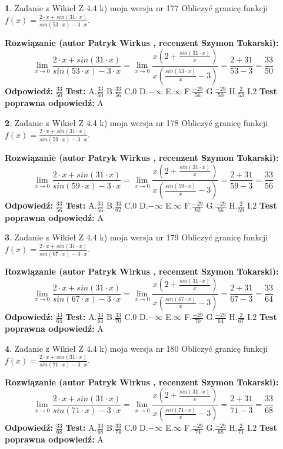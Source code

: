 \documentclass[12pt, a4paper]{article}
\theoremstyle{definition} %
\newtheorem{zad}{}
\newcommand{\zadStart}[1]{\begin{zad}#1\newline}
\newcommand{\zadStop}{\end{zad}}
\newcommand{\rozwStart}[2]{\noindent \textbf{Rozwiązanie (autor #1 , recenzent #2): }\newline}
\newcommand{\rozwStop}{\newline}
\newcommand{\odpStart}{\noindent \textbf{Odpowiedź:}\newline}
\newcommand{\odpStop}{\newline}
\newcommand{\testStart}{\noindent \textbf{Test:}\newline}
\newcommand{\testStop}{\newline}
\newcommand{\kluczStart}{\noindent \textbf{Test poprawna odpowiedź:}\newline}
\newcommand{\kluczStop}{\newline}
\begin{document}
\zadStart{Zadanie z Wikieł Z 4.4 k) moja wersja nr 177}
Obliczyć granicę funkcji $f(x)=\frac{2\cdot x +sin(31\cdot x)}{sin(53\cdot x) -3\cdot x}$.
\zadStop
\rozwStart{Patryk Wirkus}{Szymon Tokarski}
$$\lim\limits_{x\to 0}\frac{2\cdot x +sin(31\cdot x)}{sin(53\cdot x) -3\cdot x}
=\lim\limits_{x\to 0}\frac{x(2+\frac{sin(31\cdot x)}{x})}{x(\frac{sin(53\cdot x)}{x}-3)}
=\frac{2+31}{53-3} = \frac{33}{50}$$
\rozwStop
\odpStart
$\frac{33}{50}$
\odpStop
\testStart
A.$\frac{33}{50}$
B.$\frac{33}{56}$
C.$0$
D.$-\infty$
E.$\infty$
F.$\frac{-29}{56}$
G.$\frac{-29}{50}$
H.$\frac{2}{53}$
I.$2$
\testStop
\kluczStart
A
\kluczStop



\zadStart{Zadanie z Wikieł Z 4.4 k) moja wersja nr 178}
Obliczyć granicę funkcji $f(x)=\frac{2\cdot x +sin(31\cdot x)}{sin(59\cdot x) -3\cdot x}$.
\zadStop
\rozwStart{Patryk Wirkus}{Szymon Tokarski}
$$\lim\limits_{x\to 0}\frac{2\cdot x +sin(31\cdot x)}{sin(59\cdot x) -3\cdot x}
=\lim\limits_{x\to 0}\frac{x(2+\frac{sin(31\cdot x)}{x})}{x(\frac{sin(59\cdot x)}{x}-3)}
=\frac{2+31}{59-3} = \frac{33}{56}$$
\rozwStop
\odpStart
$\frac{33}{56}$
\odpStop
\testStart
A.$\frac{33}{56}$
B.$\frac{33}{62}$
C.$0$
D.$-\infty$
E.$\infty$
F.$\frac{-29}{62}$
G.$\frac{-29}{56}$
H.$\frac{2}{59}$
I.$2$
\testStop
\kluczStart
A
\kluczStop



\zadStart{Zadanie z Wikieł Z 4.4 k) moja wersja nr 179}
Obliczyć granicę funkcji $f(x)=\frac{2\cdot x +sin(31\cdot x)}{sin(67\cdot x) -3\cdot x}$.
\zadStop
\rozwStart{Patryk Wirkus}{Szymon Tokarski}
$$\lim\limits_{x\to 0}\frac{2\cdot x +sin(31\cdot x)}{sin(67\cdot x) -3\cdot x}
=\lim\limits_{x\to 0}\frac{x(2+\frac{sin(31\cdot x)}{x})}{x(\frac{sin(67\cdot x)}{x}-3)}
=\frac{2+31}{67-3} = \frac{33}{64}$$
\rozwStop
\odpStart
$\frac{33}{64}$
\odpStop
\testStart
A.$\frac{33}{64}$
B.$\frac{33}{70}$
C.$0$
D.$-\infty$
E.$\infty$
F.$\frac{-29}{70}$
G.$\frac{-29}{64}$
H.$\frac{2}{67}$
I.$2$
\testStop
\kluczStart
A
\kluczStop



\zadStart{Zadanie z Wikieł Z 4.4 k) moja wersja nr 180}
Obliczyć granicę funkcji $f(x)=\frac{2\cdot x +sin(31\cdot x)}{sin(71\cdot x) -3\cdot x}$.
\zadStop
\rozwStart{Patryk Wirkus}{Szymon Tokarski}
$$\lim\limits_{x\to 0}\frac{2\cdot x +sin(31\cdot x)}{sin(71\cdot x) -3\cdot x}
=\lim\limits_{x\to 0}\frac{x(2+\frac{sin(31\cdot x)}{x})}{x(\frac{sin(71\cdot x)}{x}-3)}
=\frac{2+31}{71-3} = \frac{33}{68}$$
\rozwStop
\odpStart
$\frac{33}{68}$
\odpStop
\testStart
A.$\frac{33}{68}$
B.$\frac{33}{74}$
C.$0$
D.$-\infty$
E.$\infty$
F.$\frac{-29}{74}$
G.$\frac{-29}{68}$
H.$\frac{2}{71}$
I.$2$
\testStop
\kluczStart
A
\kluczStop
\end{document}
